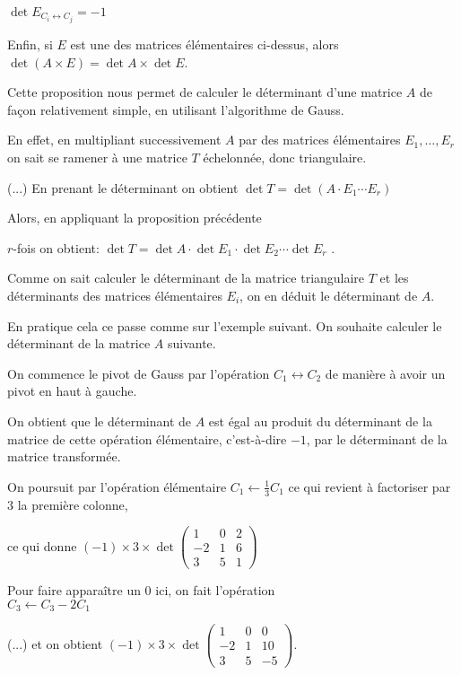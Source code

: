 \change
$\det E_{C_i \leftrightarrow C_j} = -1$

\change
Enfin, si $E$ est une des matrices élémentaires ci-dessus, alors $\det \left( A \times E \right) = \det A \times \det E$.

\change
Cette proposition nous permet de calculer le déterminant d'une matrice $A$ de façon 
relativement simple, en utilisant l'algorithme de Gauss. 

\change
En effet, en multipliant successivement $A$ par des matrices élémentaires 
$E_1,\ldots,E_r$ on sait se ramener à une matrice $T$ échelonnée, donc triangulaire.

\change
(...)
\newpage
En prenant le déterminant on obtient $\det T=\det (A \cdot E_1 \cdots E_r) $

\change
Alors, en appliquant la proposition précédente

\change
 $r$-fois on obtient: $\det T = \det A \cdot \det E_1\cdot \det E_2 \cdots \det E_r$ .
 
Comme on sait calculer le déterminant de la matrice triangulaire $T$ et les déterminants des matrices élémentaires $E_i$, on en déduit le déterminant de $A$.

\diapo
En pratique cela ce passe comme sur l'exemple suivant. On souhaite calculer  le déterminant de la matrice $A$ suivante.

\change
On commence le pivot de Gauss par l'opération $C_1 \leftrightarrow C_2$ de manière à avoir un pivot en haut à gauche.

\change
On obtient que le déterminant de $A$ est égal au produit du déterminant de la matrice de cette opération élémentaire, c'est-à-dire $-1$, par le déterminant de la matrice transformée.

\change
On poursuit par l'opération élémentaire $C_1 \leftarrow \frac{1}{3} C_1$ 
ce qui revient à factoriser par $3$ la première colonne,

\change
ce qui donne 
$(-1)\times 3 \times \det \begin{pmatrix}
        1 & 0 & 2\\
        -2& 1 & 6\\
        3 & 5 & 1  
       \end{pmatrix} 
$

\change
Pour faire apparaître un $0$ ici, on fait l'opération \\
$C_3 \leftarrow C_3-2C_1 $

\change
(...)
\newpage
et on obtient $(-1)\times 3 \times \det \begin{pmatrix}
        1 & 0 & 0\\
        -2& 1 & 10\\
        3 & 5 & -5  
       \end{pmatrix}$.


